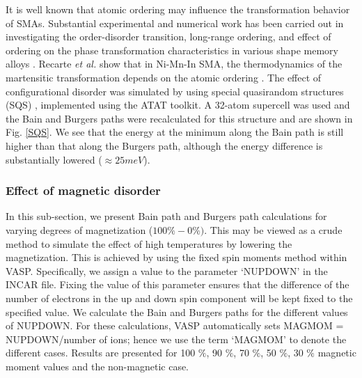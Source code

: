 \documentclass[%
preprint,
 amsmath,amssymb,
 aps,
prb,
showkeys,
]{revtex4-1}
\begin{document}
It is well known that atomic ordering may influence the transformation behavior of SMAs. Substantial experimental and numerical work has been carried out in investigating the order-disorder transition, long-range ordering, and effect of ordering on the phase transformation characteristics in various shape memory alloys \cite{singh2011effect,Obradobccstability1997,recarte2012dependence}. Recarte \textit{et al.} show that in Ni-Mn-In SMA, the thermodynamics of the martensitic transformation depends on the atomic ordering \cite{recarte2012dependence}.
The effect of configurational disorder was simulated by using special quasirandom structures (SQS)  \cite{zunger1990special}, implemented using the ATAT toolkit. A 32-atom supercell was used and the Bain and Burgers paths were recalculated for this structure and are shown in Fig. \ref{SQS}. We see that the energy at the minimum along the Bain path is still higher than that along the Burgers path, although the energy difference is substantially lowered ($\approx 25 meV $). 

\subsubsection{Effect of magnetic disorder}
\label{mag_disorder}
 In this sub-section, we present  Bain path and Burgers path calculations for varying degrees of magnetization ($100 \% - 0 \%)$.  This may be viewed as a crude method to simulate the effect of high temperatures  by lowering the magnetization. This is achieved by using the fixed spin moments method within VASP. Specifically, we assign a value to the parameter ‘NUPDOWN’ in the INCAR file. Fixing the value of this parameter ensures that the difference of the number of electrons in the up and down spin component will be kept fixed to the specified value. We calculate the Bain and Burgers paths for the different values of NUPDOWN. For these calculations, VASP automatically sets MAGMOM = NUPDOWN/number of ions; hence we use the term ‘MAGMOM’ to denote the different cases. Results are presented for 100 $\%$,  90 $\%$, 70 $\%$, 50 $\%$, 30 $\%$  magnetic moment values and the non-magnetic case. 
\end{document}
